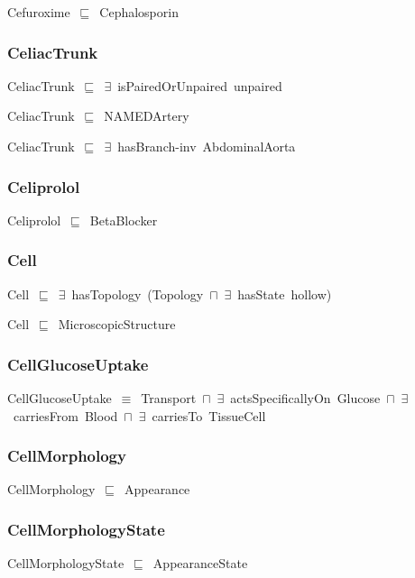 \documentclass{article}
\begin{document}
Cefuroxime~\ensuremath{\sqsubseteq}~Cephalosporin~

\subsubsection*{CeliacTrunk}

CeliacTrunk~\ensuremath{\sqsubseteq}~\ensuremath{\exists}~isPairedOrUnpaired~unpaired~

CeliacTrunk~\ensuremath{\sqsubseteq}~NAMEDArtery~

CeliacTrunk~\ensuremath{\sqsubseteq}~\ensuremath{\exists}~hasBranch-inv~AbdominalAorta~

\subsubsection*{Celiprolol}

Celiprolol~\ensuremath{\sqsubseteq}~BetaBlocker~

\subsubsection*{Cell}

Cell~\ensuremath{\sqsubseteq}~\ensuremath{\exists}~hasTopology~(Topology~\ensuremath{\sqcap}~\ensuremath{\exists}~hasState~hollow)~

Cell~\ensuremath{\sqsubseteq}~MicroscopicStructure~

\subsubsection*{CellGlucoseUptake}

CellGlucoseUptake~\ensuremath{\equiv}~Transport~\ensuremath{\sqcap}~\ensuremath{\exists}~actsSpecificallyOn~Glucose~\ensuremath{\sqcap}~\ensuremath{\exists}~carriesFrom~Blood~\ensuremath{\sqcap}~\ensuremath{\exists}~carriesTo~TissueCell

\subsubsection*{CellMorphology}

CellMorphology~\ensuremath{\sqsubseteq}~Appearance~

\subsubsection*{CellMorphologyState}

CellMorphologyState~\ensuremath{\sqsubseteq}~AppearanceState~
\end{document}
